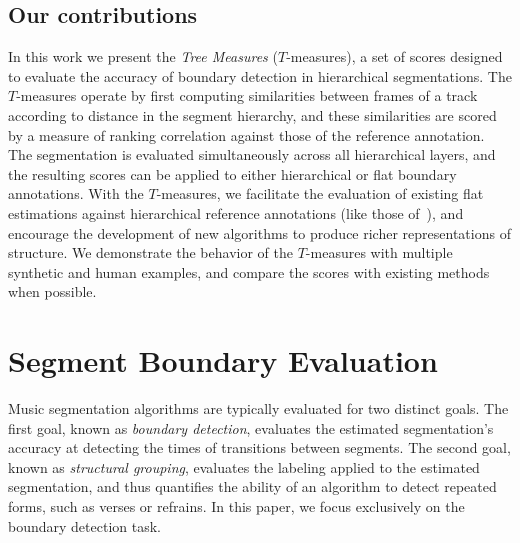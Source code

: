 \documentclass{article}
\begin{document}
\subsection{Our contributions}
In this work we present the \emph{Tree Measures} ($T$-measures), a set of scores designed
to evaluate the accuracy of boundary detection in hierarchical segmentations.
The $T$-measures operate by first computing similarities between frames of a track according to distance in the segment hierarchy, and these similarities are scored by
a measure of ranking correlation against those of the reference annotation.
The segmentation is evaluated simultaneously across all hierarchical layers, and the resulting scores can be applied to either hierarchical or flat boundary annotations.
With the $T$-measures, we facilitate the evaluation of existing flat estimations against hierarchical reference annotations (like those of~\cite{Smith2011}), and encourage the development of new algorithms
to produce richer representations of structure.
We demonstrate the behavior of the $T$-measures with multiple synthetic and human examples, and compare the scores with existing methods when possible.


\section{Segment Boundary Evaluation}\label{sec:curr_meth}

Music segmentation algorithms are typically evaluated for two distinct goals.  
The first goal, known as \emph{boundary detection}, evaluates the estimated segmentation's accuracy at detecting the times of transitions between segments.
The second goal, known as \emph{structural grouping}, evaluates the labeling applied to the estimated segmentation, and thus quantifies the ability of an
algorithm to detect repeated forms, such as verses or refrains. 
In this paper, we focus exclusively on the boundary detection task.
\end{document}
